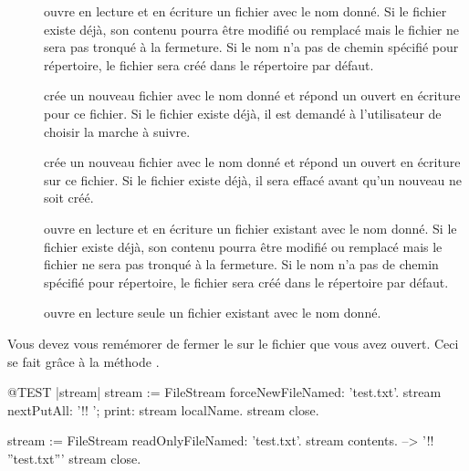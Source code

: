 \documentclass[a4paper,10pt,twoside]{book}
\begin{document}
\begin{description}

\item[] ouvre en lecture et en \'ecriture un fichier 
  avec le nom donn\'e. Si le fichier existe d\'ej\`a, son contenu pourra
  \^etre modifi\'e ou remplac\'e mais le fichier ne sera pas tronqu\'e
  \`a la fermeture. Si le nom n'a pas de chemin sp\'ecifi\'e pour r\'epertoire,
  le fichier sera cr\'e\'e dans le r\'epertoire par d\'efaut.
  
\item[] cr\'ee un nouveau fichier avec le nom donn\'e
	et r\'epond un \stream ouvert en \'ecriture pour ce fichier.
	Si le fichier existe d\'ej\`a, il est demand\'e \`a l'utilisateur
	de choisir la marche \`a suivre.
  
\item[] cr\'ee un nouveau fichier avec le nom donn\'e
	et r\'epond un \stream ouvert en \'ecriture sur ce fichier.
	Si le fichier existe d\'ej\`a, il sera effac\'e avant qu'un nouveau
	ne soit cr\'e\'e.

\item[] ouvre en lecture et en \'ecriture un fichier 
	existant avec le nom donn\'e. Si le fichier existe d\'ej\`a, son 
	contenu pourra \^etre modifi\'e ou remplac\'e mais le fichier ne sera
	pas tronqu\'e \`a la fermeture. Si le nom n'a pas de chemin sp\'ecifi\'e
	pour r\'epertoire, le fichier sera cr\'e\'e dans le r\'epertoire par
	d\'efaut.

\item[] ouvre en lecture seule un fichier 
	existant avec le nom donn\'e.

\end{description}

Vous devez vous rem\'emorer de fermer le \stream sur le fichier que vous avez ouvert. Ceci se fait gr\^ace \`a la m\'ethode .

\begin{code}{@TEST |stream|}
stream := FileStream forceNewFileNamed: 'test.txt'.
stream
    nextPutAll: '!! ';
    print: stream localName.
stream close.

stream := FileStream readOnlyFileNamed: 'test.txt'.
stream contents. --> '!! ''test.txt'''
stream close.
\end{code}
\end{document}

